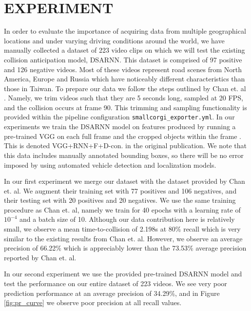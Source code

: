 \documentclass[letterpaper, 10 pt, conference]{IEEEconf}
\begin{document}
\section{EXPERIMENT}

In order to evaluate the importance of acquiring data from multiple geographical locations and under varying driving conditions around the world, we have manually collected a dataset of 223 video clips on which we will test the existing collision anticipation model, DSARNN. This dataset is comprised of 97 positive and 126 negative videos. Most of these videos represent road scenes from North America, Europe and Russia which have noticeably different characteristics than those in Taiwan. To prepare our data we follow the steps outlined by Chan et. al \cite{chan2016anticipating}. Namely, we trim videos such that they are 5 seconds long, sampled at 20 FPS, and the collision occurs at frame 90. This trimming and sampling functionality is provided within the pipeline configuration \texttt{smallcorgi\_exporter.yml}. In our experiments we train the DSARNN model on features produced by running a pre-trained VGG on each full frame and the cropped objects within the frame \cite{DBLP:journals/corr/SimonyanZ14a}. This is denoted VGG+RNN+F+D-con. in the original publication. We note that this data includes manually annotated bounding boxes, so there will be no error imposed by using automated vehicle detection and localization models.

In our first experiment we merge our dataset with the dataset provided by Chan et. al. We augment their training set with 77 positives and 106 negatives, and their testing set with 20 positives and 20 negatives. We use the same training procedure as Chan et. al, namely we train for 40 epochs with a learning rate of $10^{-4}$ and a batch size of 10. Although our data contribution here is relatively small, we observe a mean time-to-collision of 2.198s at 80\% recall which is very similar to the existing results from Chan et. al. However, we observe an average precision of 66.22\% which is appreciably lower than the 73.53\% average precision reported by Chan et. al. \cite{chan2016anticipating}

In our second experiment we use the provided pre-trained DSARNN model and test the performance on our entire dataset of 223 videos. We see very poor prediction performance at an average precision of 34.29\%, and in Figure \ref{fig:pr_curve} we observe poor precision at all recall values.
\end{document}
